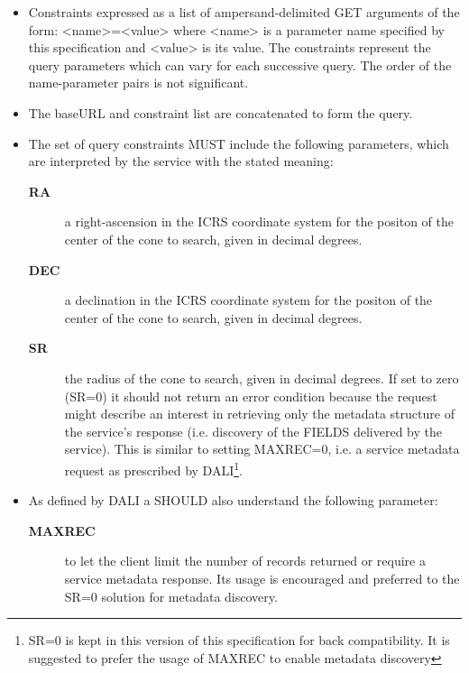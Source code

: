 \documentclass[11pt,a4paper]{ivoa}
\begin{document}
\begin{enumerate}
\begin{itemize}
		\item Constraints expressed as a list of
			ampersand-delimited GET arguments of the form: <name>=<value> where
			<name> is a parameter name specified by this specification and <value>
			is its value. The constraints represent the query parameters which can
			vary for each successive query. The order of the name-parameter pairs is
			not significant.
		\item The baseURL and constraint list are concatenated
			to form the query. 
		\item The set of query constraints MUST include the
			following parameters, which are interpreted by the service with the
			stated meaning: 
			\begin{description}
				\item[\textbf{RA}] a right-ascension
					in the ICRS coordinate system for the positon of the center of the cone
					to search, given in decimal degrees.
				\item[\textbf{DEC}] a declination
					in the ICRS coordinate system for the positon of the center of the cone
					to search, given in decimal degrees.
				\item[\textbf{SR}] the radius of the cone to search, given in decimal degrees.
					If set to zero (SR=0) it should not return an error condition because the
					request might describe an interest in retrieving only the metadata structure
					of the service's response (i.e. discovery of the FIELDS delivered by the service).
					This is similar to setting MAXREC=0, i.e. a service metadata request as prescribed
					by DALI\footnote{SR=0 is kept in this version of this specification for back
					compatibility. It is suggested to prefer the usage of MAXREC to enable metadata
					discovery}\citep{2017ivoa.spec.0517D}.
			\end{description}
		\item As defined by DALI a SHOULD also understand the following parameter:
			\begin{description}
				\item[\textbf{MAXREC}] to let the client limit the number of records returned
					or require a service metadata response. Its usage is encouraged and preferred
					to the SR=0 solution for metadata discovery.
			\end{description}

\end{itemize}
\end{enumerate}
\end{document}
